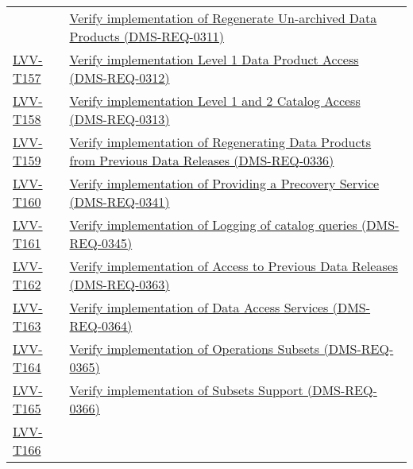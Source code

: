 \begin{longtable}[]{@{}ll@{}}
&
\href{https://jira.lsstcorp.org/secure/Tests.jspa\#/testCase/LVV-T156}{Verify
implementation of Regenerate Un-archived Data Products
(DMS-REQ-0311)}\tabularnewline
\protect\hyperlink{lvv-t157---verify-implementation-level-1-data-product-access-dms-req-0312}{LVV-T157}
&
\href{https://jira.lsstcorp.org/secure/Tests.jspa\#/testCase/LVV-T157}{Verify
implementation Level 1 Data Product Access
(DMS-REQ-0312)}\tabularnewline
\protect\hyperlink{lvv-t158---verify-implementation-level-1-and-2-catalog-access-dms-req-0313}{LVV-T158}
&
\href{https://jira.lsstcorp.org/secure/Tests.jspa\#/testCase/LVV-T158}{Verify
implementation Level 1 and 2 Catalog Access
(DMS-REQ-0313)}\tabularnewline
\protect\hyperlink{lvv-t159---verify-implementation-of-regenerating-data-products-from-previous-data-releases-dms-req-0336}{LVV-T159}
&
\href{https://jira.lsstcorp.org/secure/Tests.jspa\#/testCase/LVV-T159}{Verify
implementation of Regenerating Data Products from Previous Data Releases
(DMS-REQ-0336)}\tabularnewline
\protect\hyperlink{lvv-t160---verify-implementation-of-providing-a-precovery-service-dms-req-0341}{LVV-T160}
&
\href{https://jira.lsstcorp.org/secure/Tests.jspa\#/testCase/LVV-T160}{Verify
implementation of Providing a Precovery Service
(DMS-REQ-0341)}\tabularnewline
\protect\hyperlink{lvv-t161---verify-implementation-of-logging-of-catalog-queries-dms-req-0345}{LVV-T161}
&
\href{https://jira.lsstcorp.org/secure/Tests.jspa\#/testCase/LVV-T161}{Verify
implementation of Logging of catalog queries
(DMS-REQ-0345)}\tabularnewline
\protect\hyperlink{lvv-t162---verify-implementation-of-access-to-previous-data-releases-dms-req-0363}{LVV-T162}
&
\href{https://jira.lsstcorp.org/secure/Tests.jspa\#/testCase/LVV-T162}{Verify
implementation of Access to Previous Data Releases
(DMS-REQ-0363)}\tabularnewline
\protect\hyperlink{lvv-t163---verify-implementation-of-data-access-services-dms-req-0364}{LVV-T163}
&
\href{https://jira.lsstcorp.org/secure/Tests.jspa\#/testCase/LVV-T163}{Verify
implementation of Data Access Services (DMS-REQ-0364)}\tabularnewline
\protect\hyperlink{lvv-t164---verify-implementation-of-operations-subsets-dms-req-0365}{LVV-T164}
&
\href{https://jira.lsstcorp.org/secure/Tests.jspa\#/testCase/LVV-T164}{Verify
implementation of Operations Subsets (DMS-REQ-0365)}\tabularnewline
\protect\hyperlink{lvv-t165---verify-implementation-of-subsets-support-dms-req-0366}{LVV-T165}
&
\href{https://jira.lsstcorp.org/secure/Tests.jspa\#/testCase/LVV-T165}{Verify
implementation of Subsets Support (DMS-REQ-0366)}\tabularnewline
\protect\hyperlink{lvv-t166---verify-implementation-of-access-services-performance-dms-req-0367}{LVV-T166}

\end{longtable}
